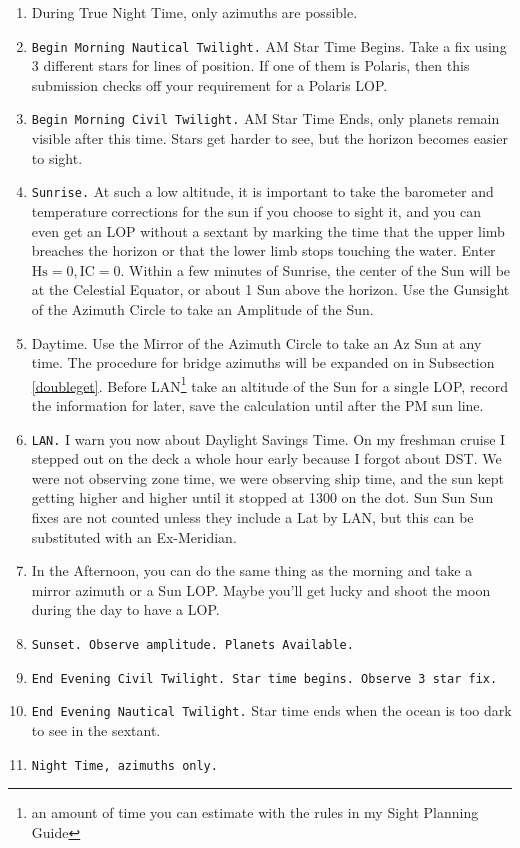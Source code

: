 \documentclass[letterpaper,12pt]{article}
\begin{document}
\begin{enumerate}
\item During True Night Time, only azimuths are possible.
\item \texttt{Begin Morning Nautical Twilight.}
AM Star Time Begins.
Take a fix using 3 different stars for lines of position.
If one of them is Polaris, then this submission checks off your requirement for a Polaris LOP.
\item \texttt{Begin Morning Civil Twilight.}
AM Star Time Ends, only planets remain visible after this time.
Stars get harder to see, but the horizon becomes easier to sight.
    \item \texttt{Sunrise.}
	    At such a low altitude, it is important to take the barometer and temperature corrections for the sun if you choose to sight it, and you can even get an LOP without a sextant by marking the time that the upper limb breaches the horizon or that the lower limb stops touching the water.
	    Enter \(\text{Hs}=0, \text{IC}=0\).
	    Within a few minutes of Sunrise, the center of the Sun will be at the Celestial Equator, or about 1 Sun above the horizon.
	    Use the Gunsight of the Azimuth Circle to take an Amplitude of the Sun.
    \item Daytime.
	    Use the Mirror of the Azimuth Circle to take an Az Sun at any time.
	    The procedure for bridge azimuths will be expanded on in Subsection \ref{doubleget}.
	    Before LAN\footnote{an amount of time you can estimate with the rules in my Sight Planning Guide} take an altitude of the Sun for a single LOP, record the information for later, save the calculation until after the PM sun line.
    \item \texttt{LAN.}
	    I warn you now about Daylight Savings Time.
	    On my freshman cruise I stepped out on the deck a whole hour early because I forgot about DST.
	    We were not observing zone time, we were observing ship time, and the sun kept getting higher and higher until it stopped at 1300 on the dot.
	    Sun Sun Sun fixes are not counted unless they include a Lat by LAN, but this can be substituted with an Ex-Meridian.
    \item In the Afternoon, you can do the same thing as the morning and take a mirror azimuth or a Sun LOP.
	    Maybe you'll get lucky and shoot the moon during the day to have a  LOP.
    \item \texttt{Sunset.
	    Observe amplitude.
    Planets Available.}
    \item \texttt{End Evening Civil Twilight.
	    Star time begins.
    Observe 3 star fix.}
\item \texttt{End Evening Nautical Twilight.}
Star time ends when the ocean is too dark to see in the sextant. 
    \item \texttt{Night Time, azimuths only.}
\end{enumerate}
\end{document}
